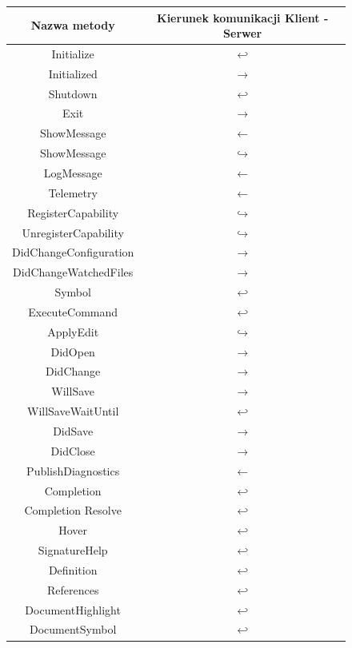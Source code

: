 \begin{figure}[H]
    \centering
    \small
\begin{tabular}{|c|c|}
\hline
Nazwa metody & Kierunek komunikacji Klient - Serwer\\
\hline
Initialize & $\hookleftarrow$ \\   
\hline
Initialized & $\rightarrow$ \\
\hline
Shutdown & $\hookleftarrow$ \\   
\hline
Exit & $\rightarrow$ \\
\hline
ShowMessage & $\leftarrow$ \\
\hline
ShowMessage & $\hookrightarrow$ \\
\hline
LogMessage & $\leftarrow$ \\
\hline
Telemetry & $\leftarrow$ \\
\hline
RegisterCapability & $\hookrightarrow$ \\
\hline
UnregisterCapability & $\hookrightarrow$ \\
\hline
DidChangeConfiguration & $\rightarrow$ \\
\hline
DidChangeWatchedFiles & $\rightarrow$ \\
\hline
Symbol & $\hookleftarrow$ \\
\hline
ExecuteCommand & $\hookleftarrow$ \\
\hline
ApplyEdit & $\hookrightarrow$ \\
\hline
DidOpen & $\rightarrow$ \\
\hline
DidChange & $\rightarrow$ \\
\hline
WillSave & $\rightarrow$ \\
\hline
WillSaveWaitUntil & $\hookleftarrow$ \\
\hline
DidSave & $\rightarrow$ \\
\hline
DidClose & $\rightarrow$ \\
\hline
PublishDiagnostics & $\leftarrow$ \\
\hline
Completion & $\hookleftarrow$ \\
\hline
Completion Resolve & $\hookleftarrow$ \\
\hline
Hover & $\hookleftarrow$ \\
\hline
SignatureHelp & $\hookleftarrow$ \\
\hline
Definition & $\hookleftarrow$ \\
\hline
References & $\hookleftarrow$ \\
\hline
DocumentHighlight & $\hookleftarrow$ \\
\hline
DocumentSymbol & $\hookleftarrow$ \\

\end{tabular}
\end{figure}
